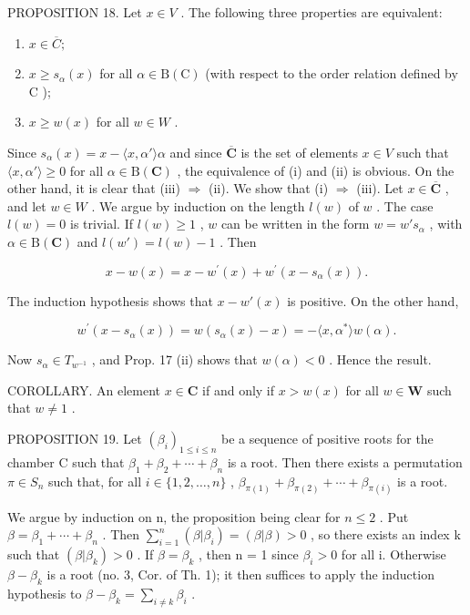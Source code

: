 PROPOSITION 18. Let \(x \in V\) . The following three properties are equivalent:

\begin{enumerate}
\def\labelenumi{(\roman{enumi})}
\item
  \(x \in \overline{C};\)
\item
  \(x \geqslant s_{\alpha}(x)\) for all \(\alpha \in \mathrm{B}(\mathrm{C})\) (with respect to the order relation defined by \(\mathrm{C}\) );
\item
  \(x \geqslant w(x)\) for all \(w \in W\) .
\end{enumerate}

Since \(s_{\alpha}(x) = x - \langle x, \alpha' \rangle \alpha\) and since \(\overline{\mathbf{C}}\) is the set of elements \(x \in V\) such that \(\langle x, \alpha' \rangle \geqslant 0\) for all \(\alpha \in \mathrm{B}(\mathbf{C})\) , the equivalence of (i) and (ii) is obvious. On the other hand, it is clear that (iii) \(\Longrightarrow\) (ii). We show that (i) \(\Longrightarrow\) (iii). Let \(x \in \overline{\mathbf{C}}\) , and let \(w \in W\) . We argue by induction on the length \(l(w)\) of \(w\) . The case \(l(w) = 0\) is trivial. If \(l(w) \geqslant 1\) , \(w\) can be written in the form \(w = w's_{\alpha}\) , with \(\alpha \in \mathrm{B}(\mathbf{C})\) and \(l(w') = l(w) - 1\) . Then

\[
x - w (x) = x - w ^ {\prime} (x) + w ^ {\prime} \left(x - s _ {\alpha} (x)\right).
\]

The induction hypothesis shows that \(x - w'(x)\) is positive. On the other hand,

\[
w ^ {\prime} (x - s _ {\alpha} (x)) = w \left(s _ {\alpha} (x) - x\right) = - \langle x, \alpha^ {*} \rangle w (\alpha).
\]

Now \(s_{\alpha} \in T_{w^{-1}}\) , and Prop. 17 (ii) shows that \(w(\alpha) < 0\) . Hence the result.

COROLLARY. An element \(x \in \mathbf{C}\) if and only if \(x > w(x)\) for all \(w \in \mathbf{W}\) such that \(w \neq 1\) .

PROPOSITION 19. Let \((\beta_{i})_{1\leqslant i\leqslant n}\) be a sequence of positive roots for the chamber C such that \(\beta_{1}+\beta_{2}+\cdots+\beta_{n}\) is a root. Then there exists a permutation \(\pi\in S_{n}\) such that, for all \(i\in\{1,2,\ldots,n\}\) , \(\beta_{\pi(1)}+\beta_{\pi(2)}+\cdots+\beta_{\pi(i)}\) is a root.

We argue by induction on n, the proposition being clear for \(n \leqslant 2\) . Put \(\beta = \beta_{1} + \cdots + \beta_{n}\) . Then \(\sum_{i=1}^{n} (\beta | \beta_{i}) = (\beta | \beta) > 0\) , so there exists an index k such that \((\beta | \beta_{k}) > 0\) . If \(\beta = \beta_{k}\) , then n = 1 since \(\beta_{i} > 0\) for all i. Otherwise \(\beta - \beta_{k}\) is a root (no. 3, Cor. of Th. 1); it then suffices to apply the induction hypothesis to \(\beta - \beta_{k} = \sum_{i \neq k} \beta_{i}\) .

